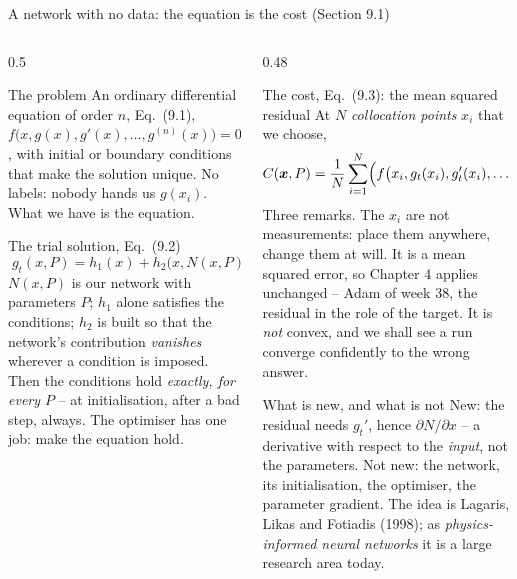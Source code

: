 \documentclass[10pt,aspectratio=169]{beamer}
\begin{document}
\begin{frame}{A network with no data: the equation is the cost (Section 9.1)}
\small
\begin{columns}[T]
\begin{column}{0.5\textwidth}
\begin{block}{The problem}
\footnotesize
An ordinary differential equation of order $n$, Eq.~(9.1),
$f\bigl(x,g(x),g'(x),\dots,g^{(n)}(x)\bigr)=0$, with initial or boundary
conditions that make the solution unique.  No labels: nobody hands us
$g(x_i)$.  What we have is the equation.
\end{block}
\begin{block}{The trial solution, Eq.~(9.2)}
\footnotesize
\[
  \boxed{\;g_t(x,P)=h_1(x)+h_2\bigl(x,N(x,P)\bigr)\;}
\]
$N(x,P)$ is our network with parameters $P$; $h_1$ alone satisfies the
conditions; $h_2$ is built so that the network's contribution
\emph{vanishes} wherever a condition is imposed.  Then the conditions hold
\emph{exactly, for every $P$} -- at initialisation, after a bad step, always.
The optimiser has one job: make the equation hold.
\end{block}
\end{column}
\begin{column}{0.48\textwidth}
\begin{block}{The cost, Eq.~(9.3): the mean squared residual}
\scriptsize
At $N$ \emph{collocation points} $x_i$ that we choose,
\[
  C(\bm{x},P)=\frac1N\sum_{i=1}^{N}
  \Bigl(f\bigl(x_i,g_t(x_i),g_t'(x_i),\dots\bigr)\Bigr)^{2}.
\]
Three remarks.  The $x_i$ are not measurements: place them anywhere, change
them at will.  It is a mean squared error, so Chapter 4 applies unchanged --
Adam of week 38, the residual in the role of the target.  It is \emph{not}
convex, and we shall see a run converge confidently to the wrong answer.
\end{block}
\begin{block}{What is new, and what is not}
\scriptsize
New: the residual needs $g_t'$, hence $\partial N/\partial x$ -- a derivative
with respect to the \emph{input}, not the parameters.  Not new: the network,
its initialisation, the optimiser, the parameter gradient.  The idea is
Lagaris, Likas and Fotiadis (1998); as \emph{physics-informed neural
networks} it is a large research area today.
\end{block}
\end{column}
\end{columns}
\end{frame}
\end{document}
